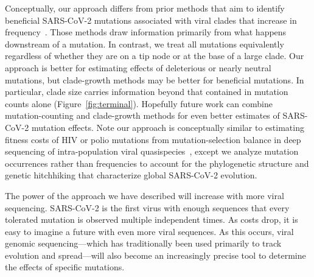 \documentclass[9pt,twocolumn,twoside]{gsajnl_modified}
\begin{document}
Conceptually, our approach differs from prior methods that aim to identify beneficial SARS-CoV-2 mutations associated with viral clades that increase in frequency~\citep{obermeyer2022analysis,lee2022inferring,maher2022predicting}.
Those methods draw information primarily from what happens downstream of a mutation.
In contrast, we treat all mutations equivalently regardless of whether they are on a tip node or at the base of a large clade.
Our approach is better for estimating effects of deleterious or nearly neutral mutations, but clade-growth methods may be better for beneficial mutations.
In particular, clade size carries information beyond that contained in mutation counts alone (Figure~\ref{fig:terminal}).
Hopefully future work can combine mutation-counting and clade-growth methods for even better estimates of SARS-CoV-2 mutation effects.
Note our approach is conceptually similar to estimating fitness costs of HIV or polio mutations from mutation-selection balance in deep sequencing of intra-population viral quasispecies~\citep{zanini2017vivo, acevedo2014mutational}, except we analyze mutation occurrences rather than frequencies to account for the phylogenetic structure and genetic hitchhiking that characterize global SARS-CoV-2 evolution.

The power of the approach we have described will increase with more viral sequencing.
SARS-CoV-2 is the first virus with enough sequences that every tolerated mutation is observed multiple independent times.
As costs drop, it is easy to imagine a future with even more viral sequences.
As this occurs, viral genomic sequencing---which has traditionally been used primarily to track evolution and spread---will also become an increasingly precise tool to determine the effects of specific mutations.
\end{document}
